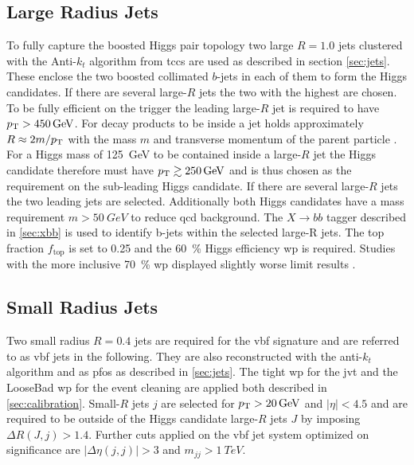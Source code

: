 \subsection{Large Radius Jets}
To fully capture the boosted Higgs pair topology two large $R=1.0$ jets clustered with the Anti-$k_t$ algorithm from \acp{tcc} are used as described in section \ref{sec:jets}. These enclose the two boosted collimated $b$-jets in each of them to form the Higgs candidates. If there are several large-$R$ jets the two with the highest \pt are chosen. To be fully efficient on the trigger the leading large-$R$ jet is required to have $p_{\text{T}}>\qty[]{450}{GeV}$. For decay products to be inside a jet holds approximately $R\approx 2m/p_{\text{T}}$ with the mass $m$ and transverse momentum of the parent particle \citep{ATLAS-CONF-2020-022}. For a Higgs mass of \qty[]{125}{GeV} to be contained inside a large-$R$ jet the Higgs candidate therefore must have $p_{\text{T}}\gtrsim \qty[]{250}{GeV}$ and is thus chosen as the \pt requirement on the sub-leading Higgs candidate. If there are several large-$R$ jets the two leading \pt jets are selected. Additionally both Higgs candidates have a mass requirement $m>\qty[]{50}{GeV}$ to reduce \ac{qcd} background.
The $X\rightarrow bb$ tagger described in \ref{sec:xbb} is used to identify b-jets within the selected large-R jets. The top fraction $f_\text{top}$ is set to 0.25 and the \qty[]{60}{\percent} Higgs efficiency \ac{wp} is required. Studies with the more inclusive \qty[]{70}{\percent} \ac{wp} displayed slightly worse limit results \citep{ATL-COM-PHYS-2023-033}.

\subsection{Small Radius Jets}
Two small radius $R=0.4$ jets are required for the \ac{vbf} signature and are referred to as \ac{vbf} jets in the following. They are also reconstructed with the anti-$k_t$ algorithm and as \acp{pfo} as described in \ref{sec:jets}. The tight \ac{wp} for the \ac{jvt} and the LooseBad \ac{wp} for the event cleaning are applied both described in \ref{sec:calibration}. Small-$R$ jets $j$ are selected for $p_{\text{T}}>\qty[]{20}{GeV}$ and $|\eta|<4.5$ and are required to be outside of the Higgs candidate large-$R$ jets $J$ by imposing $\Delta R(J,j) > 1.4$. Further cuts applied on the \ac{vbf} jet system optimized on significance are $|\Delta\eta(j,j)| > 3$ and $m_{jj} > \qty{1}{TeV}$.


